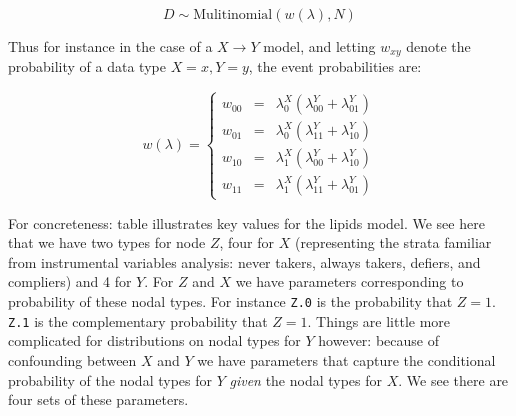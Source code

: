 \documentclass[
  11pt,
  article]{jss}
\begin{document}
\[D \sim \text{Mulitinomial}(w(\lambda), N)\]

Thus for instance in the case of a \(X \rightarrow Y\) model, and
letting \(w_{xy}\) denote the probability of a data type \(X=x, Y=y\),
the event probabilities are:

\[w(\lambda) = \left\{\begin{array}{ccc} w_{00} & = & \lambda^X_0(\lambda^Y_{00} + \lambda^Y_{01})\\ 
w_{01} & = & \lambda^X_0(\lambda^Y_{11} + \lambda^Y_{10})\\
w_{10} & = & \lambda^X_1(\lambda^Y_{00} + \lambda^Y_{10})\\
w_{11} & = & \lambda^X_1(\lambda^Y_{11} + \lambda^Y_{01})\end{array} \right.\]

For concreteness: table \citet{lipidspar} illustrates key values for the
lipids model. We see here that we have two types for node \(Z\), four
for \(X\) (representing the strata familiar from instrumental variables
analysis: never takers, always takers, defiers, and compliers) and 4 for
\(Y\). For \(Z\) and \(X\) we have parameters corresponding to
probability of these nodal types. For instance \texttt{Z.0} is the
probability that \(Z=1\). \texttt{Z.1} is the complementary probability
that \(Z=1\). Things are little more complicated for distributions on
nodal types for \(Y\) however: because of confounding between \(X\) and
\(Y\) we have parameters that capture the conditional probability of the
nodal types for \(Y\) \emph{given} the nodal types for \(X\). We see
there are four sets of these parameters.
\end{document}
